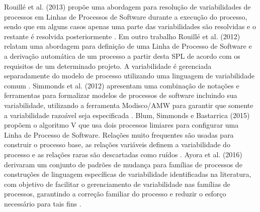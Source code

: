 Rouillé et al. (2013) propõe uma abordagem para resolução de variabilidades de processos em Linhas de Processos de Software durante a execução do processo, sendo que em alguns casos apenas uma parte das variabilidades são resolvidas e o restante é resolvida posteriormente \cite{14rouille:2013}. Em outro trabalho Rouillé et al. (2012) relatam uma abordagem para definição de uma Linha de Processo de Software e a derivação automática de um processo a partir desta SPL de acordo com os requisitos de um determinado projeto. A variabilidade é gerenciada separadamente do modelo de processo utilizando uma linguagem de variabilidade comum \cite{2rouille:2012}. Simmonds et al. (2012) apresentam uma combinação de notações e ferramentas para formalizar modelos de processos de software incluindo sua variabilidade, utilizando a ferramenta Modisco/AMW para garantir que somente a variabilidade razoável seja especificada \cite{12simmonds:2012}. Blum, Simmonds e Bastarrica (2015) propõem o algoritmo V que usa dois processos limiares para configurar uma Linha de Processo de Software. Relações muito frequentes são usadas para construir o processo base, as relações variáveis definem a variabilidade do processo e as relações raras são descartadas como ruídos \cite{15blum:2015}. Ayora et al. (2016) derivaram um conjunto de padrões de mudança para famílias de processos de construções de linguagem específicas de variabilidade identificadas na literatura, com objetivo de facilitar o gerenciamento de variabilidade nas famílias de processos, garantindo a correção familiar do processo e reduzir o esforço necessário para tais fins \cite{19ayora:2016}.


